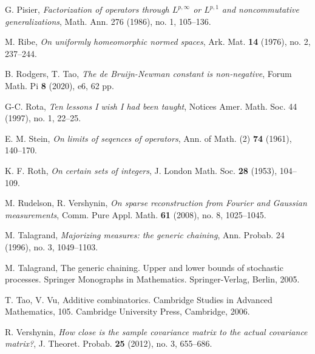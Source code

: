\documentclass[12pt,a4paper,reqno]{amsart}
\numberwithin{equation}{section}
\theoremstyle{plain}
\theoremstyle{definition}
\begin{document}
\begin{thebibliography}{10}
G. Pisier, \emph{Factorization of operators through $L^{p,\infty}$ or $L^{p,1}$ and noncommutative generalizations},
Math. Ann. 276 (1986), no. 1, 105--136.

M. Ribe, \emph{On uniformly homeomorphic normed spaces}, Ark. Mat. \textbf{14} (1976), no. 2, 237--244.

B. Rodgers, T. Tao, \emph{The de Bruijn-Newman constant is non-negative},  Forum Math. Pi \textbf{8} (2020), e6, 62 pp.

G-C. Rota, \emph{Ten lessons I wish I had been taught}, Notices Amer. Math. Soc. 44 (1997), no. 1, 22--25.

E. M. Stein, \emph{On limits of seqences of operators}, Ann. of Math. (2) \textbf{74} (1961), 140--170.

K. F. Roth, \emph{On certain sets of integers}, J. London Math. Soc. \textbf{28} (1953), 104--109.

M. Rudelson, R. Vershynin, \emph{On sparse reconstruction from Fourier and Gaussian measurements}, Comm. Pure Appl. Math. \textbf{61} (2008), no. 8, 1025--1045.

M. Talagrand, \emph{Majorizing measures: the generic chaining}, Ann. Probab. 24 (1996), no. 3, 1049--1103. 

M. Talagrand, The generic chaining. Upper and lower bounds of stochastic processes. Springer Monographs in Mathematics. Springer-Verlag, Berlin, 2005.

T. Tao, V. Vu, Additive combinatorics. Cambridge Studies in Advanced Mathematics, 105. Cambridge University Press, Cambridge, 2006.

R. Vershynin, \emph{How close is the sample covariance matrix to the actual covariance matrix?}, J. Theoret. Probab. \textbf{25} (2012), no. 3, 655--686. 

\end{thebibliography}
\end{document}

